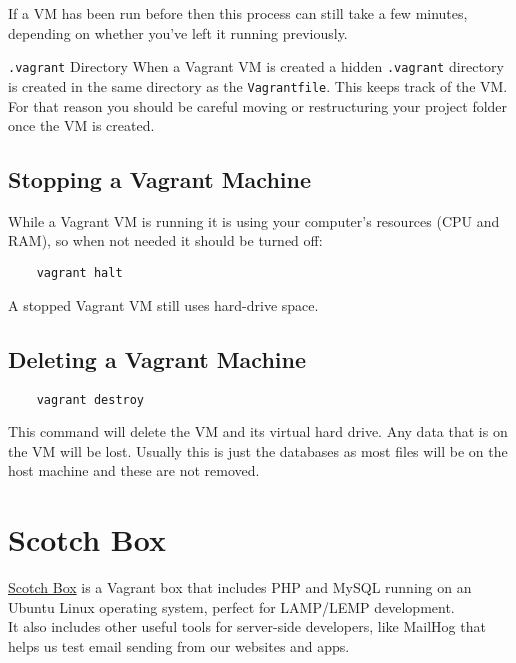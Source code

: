 If a VM has been run before then this process can still take a few minutes, depending on whether you've left it running previously.

\begin{infobox}{\texttt{.vagrant} Directory}
    When a Vagrant VM is created a hidden \texttt{.vagrant} directory is created in the same directory as the \texttt{Vagrantfile}. This keeps track of the VM.
    \\

    For that reason you should be careful moving or restructuring your project folder once the VM is created.
\end{infobox}


\subsection{Stopping a Vagrant Machine}

While a Vagrant VM is running it is using your computer's resources (CPU and RAM), so when not needed it should be turned off:

\begin{verbatim}
    vagrant halt
\end{verbatim}

A stopped Vagrant VM still uses hard-drive space.

\subsection{Deleting a Vagrant Machine}

\begin{verbatim}
    vagrant destroy
\end{verbatim}

This command will delete the VM and its virtual hard drive. Any data that is on the VM will be lost. Usually this is just the databases as most files will be on the host machine and these are not removed.


\section{Scotch Box}

\href{https://box.scotch.io}{Scotch Box} is a Vagrant box that includes PHP and MySQL running on an Ubuntu Linux operating system, perfect for LAMP/LEMP development.
\\

It also includes other useful tools for server-side developers, like MailHog that helps us test email sending from our websites and apps.

